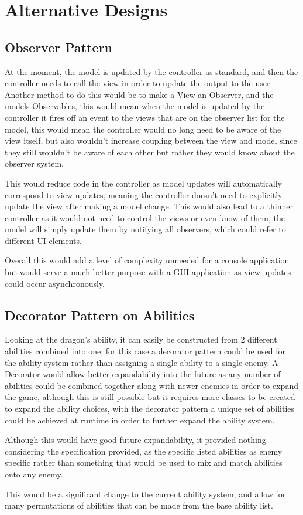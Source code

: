 \documentclass[12pt,titlepage]{article}
\begin{document}
\newpage

\section{Alternative Designs}
\subsection{Observer Pattern}
At the moment, the model is updated by the controller as standard, and then the controller needs to call the view in order to update the output to the user. Another method to do this would be to make a View an Observer, and the models Observables, this would mean when the model is updated by the controller it fires off an event to the views that are on the observer list for the model, this would mean the controller would no long need to be aware of the view itself, but also wouldn't increase coupling between the view and model since they still wouldn't be aware of each other but rather they would know about the observer system.

This would reduce code in the controller as model updates will automatically correspond to view updates, meaning the controller doesn't need to explicitly update the view after making a model change. This would also lead to a thinner controller as it would not need to control the views or even know of them, the model will simply update them by notifying all observers, which could refer to different UI elements.

Overall this would add a level of complexity unneeded for a console application but would serve a much better purpose with a GUI application as view updates could occur asynchronously.

\subsection{Decorator Pattern on Abilities}
Looking at the dragon's ability, it can easily be constructed from 2 different abilities combined into one, for this case a decorator pattern could be used for the ability system rather than assigning a single ability to a single enemy. A Decorator would allow better expandability into the future as any number of abilities could be combined together along with newer enemies in order to expand the game, although this is still possible but it requires more classes to be created to expand the ability choices, with the decorator pattern a unique set of abilities could be achieved at runtime in order to further expand the ability system.

Although this would have good future expandability, it provided nothing considering the specification provided, as the specific listed abilities as enemy specific rather than something that would be used to mix and match abilities onto any enemy.

This would be a significant change to the current ability system, and allow for many permutations of abilities that can be made from the base ability list.
\end{document}
